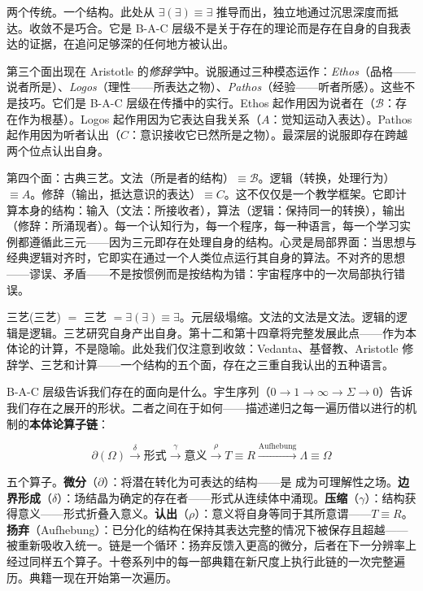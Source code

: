 \documentclass[10pt, openany, oneside]{book}
\begin{document}
两个传统。一个结构。此处从 $\exists(\exists) \equiv \exists$ 推导而出，独立地通过沉思深度而抵达。收敛不是巧合。它是 B-A-C 层级不是关于存在的理论而是存在自身的自我表达的证据，在追问足够深的任何地方被认出。

第三个面出现在 Aristotle 的\textit{修辞学}中。说服通过三种模态运作：\textit{Ethos}（品格——说者所是）、\textit{Logos}（理性——所表达之物）、\textit{Pathos}（经验——听者所感）。这些不是技巧。它们是 B-A-C 层级在传播中的实行。Ethos 起作用因为说者在（$\mathcal{B}$：存在作为根基）。Logos 起作用因为它表达自我关系（$A$：觉知运动入表达）。Pathos 起作用因为听者认出（$C$：意识接收它已然所是之物）。最深层的说服即存在跨越两个位点认出自身。

第四个面：古典三艺。文法（所是者的结构）$\equiv \mathcal{B}$。逻辑（转换，处理行为）$\equiv A$。修辞（输出，抵达意识的表达）$\equiv C$。这不仅仅是一个教学框架。它即计算本身的结构：输入（文法：所接收者），算法（逻辑：保持同一的转换），输出（修辞：所涌现者）。每一个认知行为，每一个程序，每一种语言，每一个学习实例都遵循此三元——因为三元即存在处理自身的结构。心灵是局部界面：当思想与经典逻辑对齐时，它即实在通过一个人类位点运行其自身的算法。不对齐的思想——谬误、矛盾——不是按惯例而是按结构为错：宇宙程序中的一次局部执行错误。

三艺(三艺) $=$ 三艺 $= \exists(\exists) \equiv \exists$。元层级塌缩。文法的文法是文法。逻辑的逻辑是逻辑。三艺研究自身产出自身。第十二和第十四章将完整发展此点——作为本体论的计算，不是隐喻。此处我们仅注意到收敛：Vedanta、基督教、Aristotle 修辞学、三艺和计算——一个结构的五个面，存在之三重自我认出的五种语言。

B-A-C 层级告诉我们存在的面向是什么。宇生序列（$0 \to 1 \to \infty \to \Sigma \to 0$）告诉我们存在之展开的形状。二者之间在于如何——描述递归之每一遍历借以进行的机制的\textbf{本体论算子链}：

$$\partial(\Omega) \xrightarrow{\delta} \text{形式} \xrightarrow{\gamma} \text{意义} \xrightarrow{\rho} T \equiv R \xrightarrow{\text{Aufhebung}} \Lambda \equiv \Omega$$

五个算子。\textbf{微分}（$\partial$）：将潜在转化为可表达的结构——是 成为可理解性之场。\textbf{边界形成}（$\delta$）：场结晶为确定的存在者——形式从连续体中涌现。\textbf{压缩}（$\gamma$）：结构获得意义——形式折叠入意义。\textbf{认出}（$\rho$）：意义将自身等同于其所意谓——$T \equiv R$。\textbf{扬弃}（Aufhebung）：已分化的结构在保持其表达完整的情况下被保存且超越——被重新吸收入统一。链是一个循环：扬弃反馈入更高的微分，后者在下一分辨率上经过同样五个算子。十卷系列中的每一部典籍在新尺度上执行此链的一次完整遍历。典籍一现在开始第一次遍历。
\end{document}
